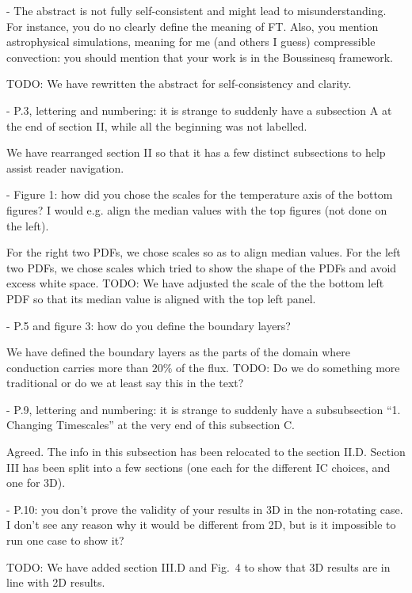 \documentclass[aps, 11pt, singlecolumn]{revtex4-1} %
\begin{document}
\begin{singlespace}
\begin{myquotation}
-       The abstract is not fully self-consistent and might lead to misunderstanding.
For instance, you do no clearly define the meaning of FT. 
Also, you mention astrophysical simulations, meaning for me (and others I guess) compressible convection: you should mention that your work is in the Boussinesq framework.
\end{myquotation}
TODO: We have rewritten the abstract for self-consistency and clarity.
\begin{myquotation}
-       P.3, lettering and numbering: it is strange to suddenly have a subsection A at the end of section II, while all the beginning was not labelled.
\end{myquotation}
We have rearranged section II so that it has a few distinct subsections to help assist reader navigation.
\begin{myquotation}
-       Figure 1: how did you chose the scales for the temperature axis of the bottom figures? 
I would e.g. align the median values with the top figures (not done on the left).
\end{myquotation}
For the right two PDFs, we chose scales so as to align median values.
For the left two PDFs, we chose scales which tried to show the shape of the PDFs and avoid excess white space.
TODO: We have adjusted the scale of the the bottom left PDF so that its median value is aligned with the top left panel.
\begin{myquotation}
-       P.5 and figure 3: how do you define the boundary layers?
\end{myquotation}
We have defined the boundary layers as the parts of the domain where conduction carries more than $20\%$ of the flux.
TODO: Do we do something more traditional or do we at least say this in the text?
\begin{myquotation}
-       P.9, lettering and numbering: it is strange to suddenly have a subsubsection “1. Changing Timescales” at the very end of this subsection C.
\end{myquotation}
Agreed.
The info in this subsection has been relocated to the section II.D.
Section III has been split into a few sections (one each for the different IC choices, and one for 3D).

\begin{myquotation}
-       P.10: you don’t prove the validity of your results in 3D in the non-rotating case. 
I don’t see any reason why it would be different from 2D, but is it impossible to run one case to show it?
\end{myquotation}
TODO: We have added section III.D and Fig.~4 to show that 3D results are in line with 2D results.


\end{singlespace}
\end{document}

